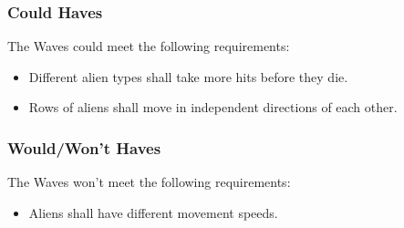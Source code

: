 \documentclass[10pt]{article}
\begin{document}
\subsubsection{Could Haves}
The Waves could meet the following requirements:
\begin{itemize}
	\item Different alien types shall take more hits before they die.
	\item Rows of aliens shall move in independent directions of each other.
\end{itemize}

\subsubsection{Would/Won't Haves}
The Waves won't meet the following requirements:
\begin{itemize}
	\item Aliens shall have different movement speeds.
\end{itemize}
\end{document}
